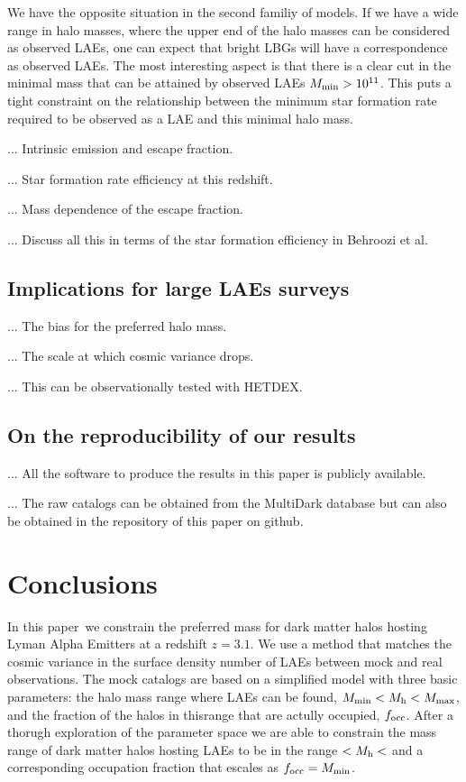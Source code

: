 \documentclass[usenatbib]{mn2e}
\newcommand{\documentname}{paper~}
\newcommand{\hMsun}{{\ifmmode{h^{-1}{\rm {M_{\odot}}}}\else{$h^{-1}{\rm{M_{\odot}}}$}\fi}}
\begin{document}
We have the opposite situation in the second familiy of models. If
we have a wide range in halo masses, where the upper end of the halo
masses can be considered as observed LAEs, one can expect that bright
LBGs will have a correspondence as observed LAEs. The most interesting
aspect is that there is a clear cut in the minimal mass that can be
attained by observed LAEs $M_{\rm min}> 10^{11}$\hMsun. This puts a tight
constraint on the relationship between the minimum star formation rate
required to be observed as a LAE and this minimal halo mass.


... Intrinsic emission and escape fraction.

... Star formation rate efficiency at this redshift.

... Mass dependence of the escape fraction.

... Discuss all this in terms of the star formation efficiency in
Behroozi et al.

\subsection{Implications for large LAEs surveys}

... The bias for the preferred halo mass.

... The scale at which cosmic variance drops.

... This can be observationally tested with HETDEX.

\subsection{On the reproducibility of our results}

... All the software to produce the results in this paper is publicly
available. 

... The raw catalogs can be obtained from the MultiDark database but
can also be obtained in the repository of this paper on github.

\section{Conclusions}
In this \documentname we constrain the preferred mass for dark matter
halos hosting Lyman Alpha Emitters at a redshift $z=3.1$. We use a
method that matches the cosmic variance in the surface
density number of LAEs between mock and real observations. The mock
catalogs are based on a simplified model with three basic parameters: the halo
mass range where LAEs can be found, $M_{\rm   min}<M_{\rm h}<M_{\rm
  max}$, and the fraction of the halos in thisrange that are actully
occupied, $f_{\rm occ}$. After a thorugh exploration of the parameter
space we are able to constrain the mass range of dark matter halos
hosting LAEs to be in the range $<M_{\rm   h}<$ and a corresponding
occupation fraction that escales as $f_{\rm   occ} = M_{\rm min}$. 
\end{document}
